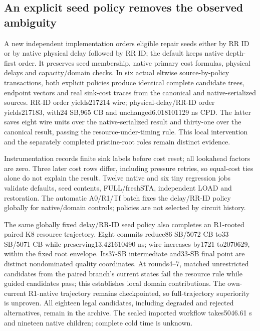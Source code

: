 \documentclass[conference,10pt]{IEEEtran}
\begin{document}
\subsection{An explicit seed policy removes the observed ambiguity}
A new independent implementation orders eligible repair seeds either by RR ID or by native physical delay followed by RR ID; the default keeps native depth-first order. It preserves seed membership, native primary cost formulas, physical delays and capacity/domain checks. In six actual eltwise source-by-policy transactions, both explicit policies produce identical complete candidate trees, endpoint vectors and real sink-cost traces from the canonical and native-serialized sources. RR-ID order yields217214 wire; physical-delay/RR-ID order yields217183, with24 SB,965 CB and unchanged6.018101129 ns CPD. The latter saves eight wire units over the native-serialized result and thirty-one over the canonical result, passing the resource-under-timing rule. This local intervention and the separately completed pristine-root roles remain distinct evidence.

Instrumentation records finite sink labels before cost reset; all lookahead factors are zero. Three later cost rows differ, including pressure retries, so equal-cost ties alone do not explain the result. Twelve native and six tiny regression jobs validate defaults, seed contents, FULL/freshSTA, independent LOAD and restoration. The automatic A0/R1/Tf batch fixes the delay/RR-ID policy globally for native/domain controls; policies are not selected by circuit history.

The same globally fixed delay/RR-ID seed policy also completes an R1-rooted paired K8 resource trajectory. Eight commits reduce86 SB/5072 CB to33 SB/5071 CB while preserving13.421610490 ns; wire increases by1721 to2070629, within the fixed root envelope. Its37-SB intermediate and33-SB final point are distinct nondominated quality coordinates. At rounds4--7, matched unrestricted candidates from the paired branch's current states fail the resource rule while guided candidates pass; this establishes local domain contributions. The own-current R1-native trajectory remains checkpointed, so full-trajectory superiority is unproven. All eighteen legal candidates, including degraded and rejected alternatives, remain in the archive. The sealed imported workflow takes5046.61 s and nineteen native children; complete cold time is unknown.
\end{document}
